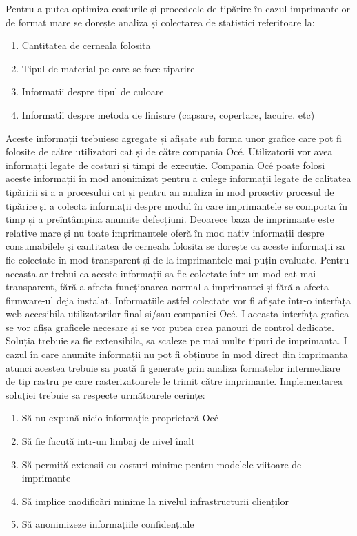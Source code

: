 \documentclass[a4paper, 12pt, twoside]{report}
\begin{document}
Pentru a putea optimiza costurile și procedeele de tipărire în cazul imprimantelor de format mare se dorește analiza și colectarea de statistici referitoare la: 
\begin{enumerate}
\item Cantitatea de cerneala folosita
\item Tipul de material pe care se face tiparire
\item Informatii despre tipul de culoare
\item Informatii despre metoda de finisare (capsare, copertare, lacuire. etc)
\end{enumerate}
Aceste informații trebuiesc agregate și afișate sub forma unor grafice care pot fi folosite de către utilizatori cat și de către compania Océ. Utilizatorii vor avea informații legate de costuri și timpi de execuție. Compania Océ poate folosi aceste informații în mod anonimizat pentru a culege informații legate de calitatea tipăririi și a a procesului cat și pentru an analiza în mod proactiv procesul de tipărire și a colecta informații despre modul în care imprimantele se comporta în timp și a preîntâmpina anumite defecțiuni.
Deoarece baza de imprimante este relative mare și nu toate imprimantele oferă în mod nativ informații despre consumabilele și cantitatea de cerneala folosita se dorește ca aceste informații sa fie colectate în mod transparent și de la imprimantele mai puțin evaluate. Pentru aceasta ar trebui ca aceste informații sa fie colectate într-un mod cat mai transparent, fără a afecta funcționarea normal a imprimantei și fără a afecta firmware-ul deja instalat.
Informațiile astfel colectate vor fi afișate într-o interfața web accesibila utilizatorilor final și/sau companiei Océ. I aceasta interfața grafica se vor afișa graficele necesare și se vor putea crea panouri de control dedicate.
Soluția trebuie sa fie extensibila, sa scaleze pe mai multe tipuri de imprimanta.
I cazul în care anumite informații nu pot fi obținute în mod direct din imprimanta atunci acestea trebuie sa poată fi generate prin analiza formatelor intermediare de tip rastru pe care rasterizatoarele le trimit către imprimante.
Implementarea soluției trebuie sa respecte următoarele cerințe:
\begin{enumerate}
\item Să nu expună nicio informație proprietară Océ
\item Să fie facută intr-un limbaj de nivel înalt
\item Să permită extensii cu costuri minime pentru modelele viitoare de imprimante
\item Să implice modificări minime la nivelul infrastructurii clienților
\item Să anonimizeze informațiile confidențiale
\end{enumerate}
\end{document}
